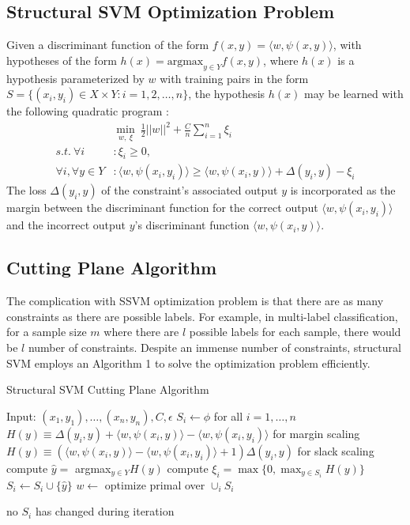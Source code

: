 \subsection{Structural SVM Optimization Problem}
Given a discriminant function of the form $f(x, y) = \langle w, \psi (x, y)\rangle$, with hypotheses of the form $h(x) = \text{argmax}_{y \in Y} f(x, y)$, where $h(x)$ is a hypothesis parameterized by $w$ with training pairs in the form $S = \{(x_i, y_i) \in X \times Y : i = 1,2,\ldots,n\}$, the hypothesis $h(x)$ may be learned with the following quadratic program \cite{Finley2009} :
\begin{align}
&\min _{w, \ \xi} \ \frac{1}{2}||w||^2 + \frac{C}{n}\sum_{i=1}^{n} \xi _i \\
s.t.\ \forall i&: \xi _i \geq 0,\\
\forall i, \forall y \in Y&: \langle w, \psi (x_i, y_i) \rangle \geq \langle w, \psi(x_i, y) \rangle + \Delta(y_i, y) - \xi _i
\end{align}
The loss $\Delta(y_i, y)$ of the constraint’s associated output $y$ is incorporated as the margin between the discriminant function for the correct output $\langle w, \psi(x_i, y_i)\rangle$ and the incorrect output $y$\rq s discriminant function $\langle w, \psi(x_i, y)\rangle$.

\subsection{Cutting Plane Algorithm}
The complication with SSVM optimization problem is that there are as many constraints as there are possible labels. For example, in multi-label classification, for a sample size $m$ where there are $l$ possible labels for each sample, there would be $l$ number of constraints. Despite an immense number of constraints, structural SVM employs an Algorithm 1 to solve the optimization problem efficiently.

\begin{algorithm}
\caption{Structural SVM Cutting Plane Algorithm}
\begin{algorithmic}[1]
\State Input: $(x_1, y_1), \ldots, (x_n, y_n), C, \epsilon $
\State $ S_i \gets \phi$ for all $i = 1, \ldots, n$
\Repeat
{}
	\State $H(y) \equiv \Delta(y_i, y) + \langle w, \psi (x_i, y) \rangle - \langle w, \psi (x_i, y_i) \rangle$ for margin scaling
	\State $H(y) \equiv (\langle w, \psi (x_i, y) \rangle - \langle w, \psi (x_i, y_i) \rangle + 1) \Delta(y_i, y)$ for slack scaling
	\State compute $\hat{y} = $ argmax$_{y \in Y} H(y)$
	\State compute $\xi _i = \max \{0, \max _{y\in S_i} H(y) \}$
		\State $S_i \gets S_i \cup \{\hat{y}\}$
		\State $w \gets $ optimize primal over $\cup _i S_i$
	\EndIf
	
\EndFor
\Until no $S_i$ has changed during iteration
\end{algorithmic}
\end{algorithm}

